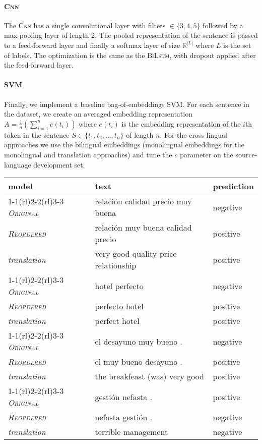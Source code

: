 \documentclass[a4paper,11pt,twocolumn,twoside]{article}
\newcommand{\R}{\mathbb{R}}
\newcommand{\original}{\textsc{Original}\xspace}
\newcommand{\mtreordered}{\textsc{Reordered}\xspace}
\newcommand{\bilstm}{\textsc{BiLstm}\xspace}
\newcommand{\cnn}{\textsc{Cnn}\xspace}
\begin{document}
\paragraph{\cnn} The \cnn has a single convolutional layer with filters $\in \{3,4,5\}$ followed by a max-pooling layer of length $2$. The pooled representation of the sentence is passed to a feed-forward layer and finally a softmax layer of size $\R^{|L|}$ where $L$ is the set of labels. The optimization is the same as the \bilstm, with dropout applied after the feed-forward layer.

\paragraph{SVM}
 Finally, we implement a baseline bag-of-embeddings SVM. For each sentence in the dataset, we create an averaged embedding representation $A= \frac{1}{n} (\sum_{i=1}^{n} e(t_{i}))$ where $e(t_{i})$ is the embedding representation of the $i$th token in the sentence $S \in \{t_{1}, t_{2}, \ldots, t_{n}\}$ of length $n$. For the cross-lingual approaches we use the bilingual embeddings (monolingual embeddings for the monolingual and translation approaches) and tune the $c$ parameter on the source-language development set.


\begin{table*}[]
\centering
\newcommand{\sepp}{\cmidrule(rl){1-1}\cmidrule(rl){2-2}\cmidrule(rl){3-3}}
\begin{tabular}{lll}
\toprule
model & text & prediction \\
\sepp
\emph{\original} & relación calidad precio muy buena & negative \\
\emph{\mtreordered} & relación muy buena calidad precio & positive \\
\textit{translation} & very good quality price relationship & positive \\
\sepp
\emph{\original} & hotel perfecto & negative \\
\emph{\mtreordered} & perfecto hotel & positive \\
\textit{translation} & perfect hotel & positive \\
\sepp
\emph{\original} & el desayuno muy bueno . & negative \\
\emph{\mtreordered} & el muy bueno desayuno . & positive \\
\textit{translation} & the breakfeast (was) very good & positive \\
\sepp
\emph{\original} & gestión nefasta . & positive \\
\emph{\mtreordered} & nefasta gestión . & negative \\
\textit{translation} & terrible management & negative \\
\bottomrule
\end{tabular}
\caption{Examples where reordering improves results over original on binary English-Spanish setup with the BiLSTM classifier}
\label{helpful_examples}

\end{table*}
\end{document}
